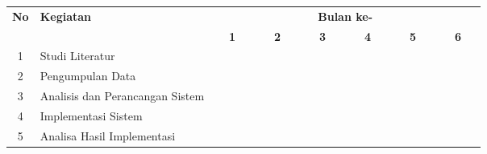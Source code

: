  
\begin{table}[h!]
  \centering
  \begin{tabular}{|c|m{2.5cm}|m{0.01cm}|m{0.01cm}|m{0.01cm}|m{0.01cm}|m{0.01cm}|m{0.01cm}|m{0.01cm}|m{0.01cm}|m{0.01cm}|m{0.01cm}|m{0.01cm}|m{0.01cm}|m{0.01cm}|m{0.01cm}|m{0.01cm}|m{0.01cm}|m{0.01cm}|m{0.01cm}|m{0.01cm}|m{0.01cm}|m{0.01cm}|m{0.01cm}|m{0.01cm}|m{0.01cm}|}
    \hline
    \multirow{2}{*}{\textbf{No}} & \multirow{2}{*}{\textbf{Kegiatan}} & \multicolumn{24}{|c|}{\textbf{Bulan ke-}} \\
    \hhline{~~------------------------}
    {} & {} & \multicolumn{4}{|c|}{\textbf{1}} & \multicolumn{4}{|c|}{\textbf{2}} & \multicolumn{4}{|c|}{\textbf{3}} & \multicolumn{4}{|c|}{\textbf{4}} & \multicolumn{4}{|c|}{\textbf{5}} & \multicolumn{4}{|c|}{\textbf{6}}\\
    \hline
    1 & Studi Literatur & \cellcolor{blue!25} & \cellcolor{blue!25} & \cellcolor{blue!25} & \cellcolor{blue!25}& \cellcolor{blue!25} & \cellcolor{blue!25} & \cellcolor{blue!25} & \cellcolor{blue!25}& \cellcolor{blue!25} & \cellcolor{blue!25} & \cellcolor{blue!25} & \cellcolor{blue!25}& \cellcolor{blue!25} & \cellcolor{blue!25} & \cellcolor{blue!25} & \cellcolor{blue!25}& \cellcolor{blue!25} & \cellcolor{blue!25} & \cellcolor{blue!25} & \cellcolor{blue!25}& \cellcolor{blue!25} & \cellcolor{blue!25} & \cellcolor{blue!25} & \cellcolor{blue!25}\\
    \hline
    2 & Pengumpulan Data & \cellcolor{blue!25} & \cellcolor{blue!25} & \cellcolor{blue!25} & \cellcolor{blue!25} & {} & {} & {} & {} & {} & {} & {} & {}& {} & {} & {} & {}& {} & {} & {} & {}& {} & {} & {} & {}\\
    \hline
    3 & Analisis dan Perancangan Sistem &  {} & {} & {} & {}  & \cellcolor{blue!25} & \cellcolor{blue!25} & \cellcolor{blue!25} & \cellcolor{blue!25} & \cellcolor{blue!25} & \cellcolor{blue!25} & \cellcolor{blue!25} & \cellcolor{blue!25} & {} & {} & {} & {}& {} & {} & {} & {}& {} & {} & {} & {}\\
    \hline
    4 & Implementasi Sistem &  {} & {} & {} & {} & {} & {} & {} & {}& \cellcolor{blue!25} & \cellcolor{blue!25} & \cellcolor{blue!25} & \cellcolor{blue!25} & \cellcolor{blue!25} & \cellcolor{blue!25} & \cellcolor{blue!25} & \cellcolor{blue!25} & {} & {} & {} & {}& {} & {} & {} & {}\\
    \hline
    5 & Analisa Hasil Implementasi &  {} & {} & {} & {} & {} & {} & {} & {}& {} & {} & {} & {} & \cellcolor{blue!25} & \cellcolor{blue!25} & \cellcolor{blue!25} & \cellcolor{blue!25} & \cellcolor{blue!25} & \cellcolor{blue!25} & \cellcolor{blue!25} & \cellcolor{blue!25} & {} & {} & {} & {}\\

\end{tabular}
\end{table}
